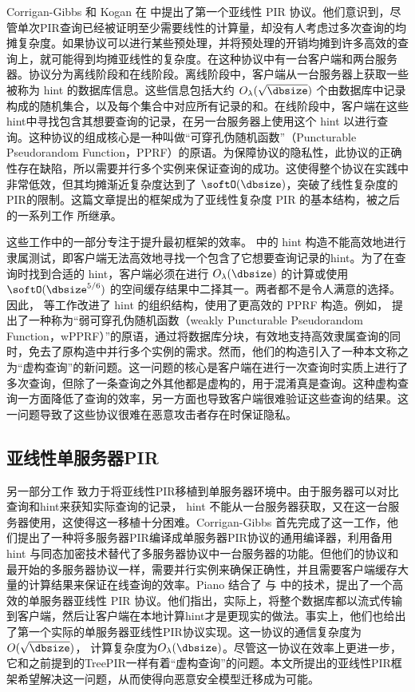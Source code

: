 Corrigan-Gibbs 和 Kogan 在 \cite{CK20} 中提出了第一个亚线性 PIR 协议。他们意识到，尽管单次PIR查询已经被证明至少需要线性的计算量，却没有人考虑过多次查询的均摊复杂度。如果协议可以进行某些预处理，并将预处理的开销均摊到许多高效的查询上，就可能得到均摊亚线性的复杂度。在这种协议中有一台客户端和两台服务器。协议分为离线阶段和在线阶段。离线阶段中，客户端从一台服务器上获取一些被称为 hint 的数据库信息。这些信息包括大约 $O_\lambda(\sqrt{\dbsize})$ 个由数据库中记录构成的随机集合，以及每个集合中对应所有记录的和。在线阶段中，客户端在这些hint中寻找包含其想要查询的记录，在另一台服务器上使用这个 hint 以进行查询。这种协议的组成核心是一种叫做“可穿孔伪随机函数”（Puncturable Pseudorandom Function，PPRF）的原语。为保障协议的隐私性，此协议的正确性存在缺陷，所以需要并行多个实例来保证查询的成功。这使得整个协议在实践中非常低效，但其均摊渐近复杂度达到了 $\softO(\dbsize)$，突破了线性复杂度的PIR的限制。这篇文章提出的框架成为了亚线性复杂度 PIR 的基本结构，被之后的一系列工作 \cite{Piano,MIR23,CHK22,Checklist,TreePIR} 所继承。

这些工作中的一部分专注于提升最初框架的效率。\cite{CK20} 中的 hint 构造不能高效地进行隶属测试，即客户端无法高效地寻找一个包含了它想要查询记录的hint。为了在查询时找到合适的 hint，客户端必须在进行 $O_\lambda(\dbsize)$ 的计算或使用 $\softO(\dbsize^{5/6})$ 的空间缓存结果中二择其一。两者都不是令人满意的选择。因此，\cite{TreePIR,C:SACM21} 等工作改进了 hint 的组织结构，使用了更高效的 PPRF 构造。例如，\cite{TreePIR} 提出了一种称为“弱可穿孔伪随机函数（weakly Puncturable Pseudorandom Function，wPPRF）”的原语，通过将数据库分块，有效地支持高效隶属查询的同时，免去了原构造中并行多个实例的需求。然而，他们的构造引入了一种本文称之为“虚构查询”的新问题。这一问题的核心是客户端在进行一次查询时实质上进行了多次查询，但除了一条查询之外其他都是虚构的，用于混淆真是查询。这种虚构查询一方面降低了查询的效率，另一方面也导致客户端很难验证这些查询的结果。这一问题导致了这些协议很难在恶意攻击者存在时保证隐私。

\subsection{亚线性单服务器PIR}
另一部分工作 \cite{Piano,CHK22} 致力于将亚线性PIR移植到单服务器环境中。由于服务器可以对比查询和hint来获知实际查询的记录， hint 不能从一台服务器获取，又在这一台服务器使用，这使得这一移植十分困难。Corrigan-Gibbs 首先完成了这一工作，他们提出了一种将多服务器PIR编译成单服务器PIR协议的通用编译器，利用备用 hint 与同态加密技术替代了多服务器协议中一台服务器的功能。但他们的协议和最开始的多服务器协议一样，需要并行实例来确保正确性，并且需要客户端缓存大量的计算结果来保证在线查询的效率。Piano \cite{Piano} 结合了 \cite{CHK22} 与 \cite{TreePIR} 中的技术，提出了一个高效的单服务器亚线性 PIR 协议。他们指出，实际上，将整个数据库都以流式传输到客户端，然后让客户端在本地计算hint才是更现实的做法。事实上，他们也给出了第一个实际的单服务器亚线性PIR协议实现。这一协议的通信复杂度为 $O(\sqrt{\dbsize})$， 计算复杂度为$O_\lambda(\dbsize)$。尽管这一协议在效率上更进一步，它和之前提到的TreePIR一样有着“虚构查询”的问题。本文所提出的亚线性PIR框架希望解决这一问题，从而使得向恶意安全模型迁移成为可能。

